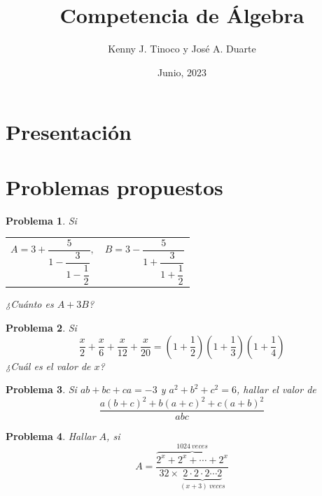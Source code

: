 \documentclass[12pt]{beamer}
\title{Competencia de Álgebra}
\author{Kenny J. Tinoco y José A. Duarte}
\institute{Curso de Polinomios\\ Academia Sabatina de Jóvenes Talento}
\date{Junio, 2023}
\newtheorem{section-problem}{Problema}
\begin{document}
   \section{Presentación}
   \frame{\titlepage}

   \section{Problemas propuestos}

   \begin{frame}
      \begin{section-problem}
         Si
         \begin{table}[H]
            \centering
            \begin{tabular}{p{4cm} p{4cm}}
               $A = 3 + \dfrac{5}{1 - \dfrac{3}{1 - \dfrac{1}{2}}},$
               &
               $B = 3 - \dfrac{5}{1 + \dfrac{3}{1 + \dfrac{1}{2}}}$
            \end{tabular}
         \end{table}
         ¿Cuánto es $A + 3B$?
      \end{section-problem}
   \end{frame}

   \begin{frame}
      \begin{section-problem}
         Si
         \[\frac{x}{2} + \frac{x}{6} + \frac{x}{12} + \frac{x}{20} = \left(1 + \frac{1}{2}\right)\left(1 + \frac{1}{3}\right)\left(1 + \frac{1}{4}\right)\]
         ¿Cuál es el valor de $x$?
      \end{section-problem}
   \end{frame}

   \begin{frame}
      \begin{section-problem}
         Si $ab + bc + ca = -3$ y $a^2 + b^2 + c^2 = 6$, hallar el valor de
         \[\frac{a(b + c)^2 + b(a + c)^2 + c(a + b)^2}{abc}\]
      \end{section-problem}
   \end{frame}

   \begin{frame}
      \begin{section-problem}
         Hallar $A$, si
         \[
            A = \frac{\overbrace{2^x + 2^x + \cdots + 2^x}^{1024 \ veces}}{32 \times \underbrace{2 \cdot 2 \cdot 2 \cdots 2}_{(x + 3) \ veces}}
         \]
      \end{section-problem}
   \end{frame}
\end{document}
